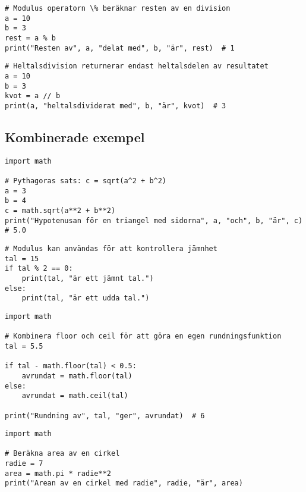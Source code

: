 \begin{lstlisting}[title=Exempel 6: Modulusoperatorn \texttt{\%}]
# Modulus operatorn \% beräknar resten av en division
a = 10
b = 3
rest = a % b
print("Resten av", a, "delat med", b, "är", rest)  # 1
\end{lstlisting}

\begin{lstlisting}[title=Exempel 7: Heltalsdivision med \texttt{//}]
# Heltalsdivision returnerar endast heltalsdelen av resultatet
a = 10
b = 3
kvot = a // b
print(a, "heltalsdividerat med", b, "är", kvot)  # 3
\end{lstlisting}

\subsection*{Kombinerade exempel}

\begin{lstlisting}[title=Exempel 8: Beräkna hypotenusan i en triangel]
import math

# Pythagoras sats: c = sqrt(a^2 + b^2)
a = 3
b = 4
c = math.sqrt(a**2 + b**2)
print("Hypotenusan för en triangel med sidorna", a, "och", b, "är", c)  # 5.0
\end{lstlisting}

\begin{lstlisting}[title=Exempel 9: Kontrollera om ett tal är jämnt eller udda]
# Modulus kan användas för att kontrollera jämnhet
tal = 15
if tal % 2 == 0:
    print(tal, "är ett jämnt tal.")
else:
    print(tal, "är ett udda tal.")
\end{lstlisting}

\begin{lstlisting}[title=Exempel 10: Rundning av tal till närmaste heltal]
import math

# Kombinera floor och ceil för att göra en egen rundningsfunktion
tal = 5.5

if tal - math.floor(tal) < 0.5:
    avrundat = math.floor(tal)
else:
    avrundat = math.ceil(tal)

print("Rundning av", tal, "ger", avrundat)  # 6
\end{lstlisting}

\begin{lstlisting}[title=Exempel 11: Area av en cirkel]
import math

# Beräkna area av en cirkel
radie = 7
area = math.pi * radie**2
print("Arean av en cirkel med radie", radie, "är", area)
\end{lstlisting}
